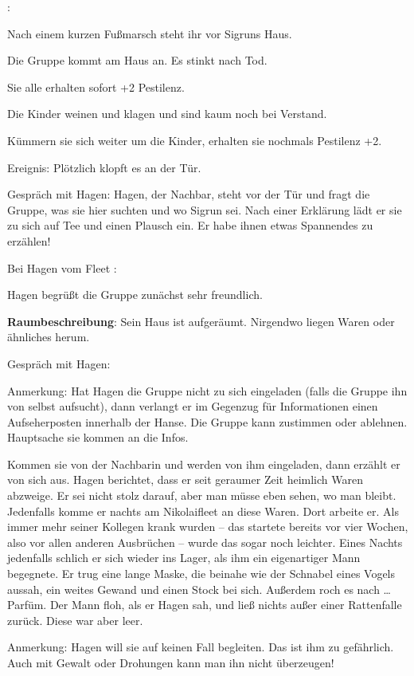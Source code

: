 :

Nach einem kurzen Fußmarsch steht ihr vor Sigruns Haus.

Die Gruppe kommt am Haus an. Es stinkt nach Tod.

Sie alle erhalten sofort +2 Pestilenz.

Die Kinder weinen und klagen und sind kaum noch bei Verstand.

Kümmern sie sich weiter um die Kinder, erhalten sie nochmals Pestilenz +2.

Ereignis: Plötzlich klopft es an der Tür.

Gespräch mit Hagen: Hagen, der Nachbar, steht vor der Tür und fragt die Gruppe, was sie hier suchten und wo Sigrun sei. Nach einer Erklärung lädt er sie zu sich auf Tee und einen Plausch ein. Er habe ihnen etwas Spannendes zu erzählen!

Bei Hagen vom Fleet
:

Hagen begrüßt die Gruppe zunächst sehr freundlich.

\textbf{Raumbeschreibung}: Sein Haus ist aufgeräumt. Nirgendwo liegen Waren oder ähnliches herum.

Gespräch mit Hagen:

Anmerkung: Hat Hagen die Gruppe nicht zu sich eingeladen (falls die Gruppe ihn von selbst aufsucht), dann verlangt er im Gegenzug für Informationen einen Aufseherposten innerhalb der Hanse. Die Gruppe kann zustimmen oder ablehnen. Hauptsache sie kommen an die Infos.

Kommen sie von der Nachbarin und werden von ihm eingeladen, dann erzählt er von sich aus.
Hagen berichtet, dass er seit geraumer Zeit heimlich Waren abzweige. Er sei nicht stolz darauf, aber man müsse eben sehen, wo man bleibt. Jedenfalls komme er nachts am Nikolaifleet an diese Waren. Dort arbeite er. Als immer mehr seiner Kollegen krank wurden – das startete bereits vor vier Wochen, also vor allen anderen Ausbrüchen – wurde das sogar noch leichter. Eines Nachts jedenfalls schlich er sich wieder ins Lager, als ihm ein eigenartiger Mann begegnete. Er trug eine lange Maske, die beinahe wie der Schnabel eines Vogels aussah, ein weites Gewand und einen Stock bei sich. Außerdem roch es nach … Parfüm. Der Mann floh, als er Hagen sah, und ließ nichts außer einer Rattenfalle zurück. Diese war aber leer.

Anmerkung: Hagen will sie auf keinen Fall begleiten. Das ist ihm zu gefährlich. Auch mit Gewalt oder Drohungen kann man ihn nicht überzeugen!

